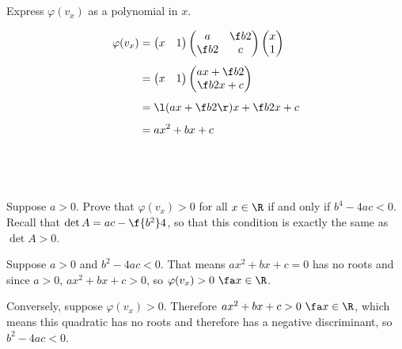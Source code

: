 \documentclass[a4paper]{article}
\begin{document}
\subsection{~} %

\begin{questionbody}
Express $\varphi(v_x)$ as a polynomial in $x$.
\end{questionbody}

\begin{align*}
\varphi(v_x) &= \begin{pmatrix}x & 1\end{pmatrix} \begin{pmatrix}a & \f b2 \\ \f b2 & c\end{pmatrix} \begin{pmatrix}x \\ 1\end{pmatrix}\\[1ex]
&= \begin{pmatrix}x & 1\end{pmatrix} \begin{pmatrix}ax + \f b2 \\ \f b2 x + c\end{pmatrix}\\[1ex]
&= \l(ax + \f b2\r)x + \f b2 x + c\\[1ex]
&= ax^2 + bx + c
\end{align*}

\clearpage
\subsection{~} %

\begin{questionbody}
Suppose $a > 0$. Prove that $\varphi(v_x) > 0$ for all $x \in \R$ if and only if $b^4 - 4ac < 0$. Recall that $\det A = ac - \f{b^2}4$, so that this condition is exactly the same as $\det A > 0$.
\end{questionbody}

Suppose $a > 0$ and $b^2 - 4ac < 0$. That means $ax^2 + bx + c = 0$ has no roots and since $a > 0$, $ax^2 + bx + c > 0$, so $\varphi(v_x) > 0\ \fa x \in \R$.

Conversely, suppose $\varphi(v_x) > 0$. Therefore $ax^2 + bx + c > 0\ \fa x \in \R$, which means this quadratic has no roots and therefore has a negative discriminant, so $b^2 - 4ac < 0$.


\end{document}
